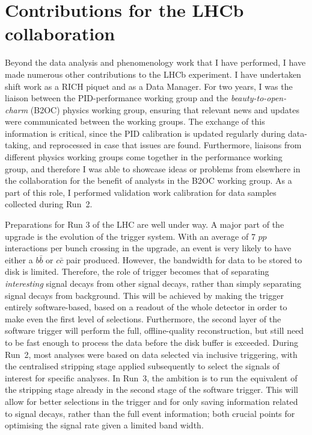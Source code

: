 \chapter{Contributions for the LHCb collaboration} %
\label{cha:contribution_for_the_lhcb_collaboration}

Beyond the data analysis and phenomenology work that I have performed, I have made numerous other contributions to the LHCb experiment. I have undertaken shift work as a RICH piquet and as a Data Manager. For two years, I was the liaison between the PID-performance working group and the \emph{beauty-to-open-charm} (B2OC) physics working group, ensuring that relevant news and updates were communicated between the working groups. The exchange of this information is critical, since the PID calibration is updated regularly during data-taking,  and reprocessed in case that issues are found. Furthermore, liaisons from different physics working groups come together in the performance working group, and therefore I was able to showcase ideas or problems from elsewhere in the collaboration for the benefit of analysts in the B2OC working group. As a part of this role, I performed validation work calibration for data samples collected during Run~2.  

Preparations for Run 3 of the LHC are well under way. A major part of the \lhcb upgrade is the evolution of the trigger system.  With an average of 7 $pp$ interactions per bunch crossing in the upgrade, an event is very likely to have either a $b\bar b$ or $c\bar c$ pair produced. However, the bandwidth for data to be stored to disk is limited. Therefore, the role of trigger becomes that of separating \emph{interesting} signal decays from other signal decays, rather than simply separating signal decays from background. This will be achieved by making the trigger entirely software-based, based on a readout of the whole detector in order to make even the first level of selections.  Furthermore, the second layer of the software trigger will perform the full, offline-quality reconstruction, but still need to be fast enough to process the data before the disk buffer is exceeded. During Run~2, most analyses were based on data selected via inclusive triggering, with the centralised stripping stage applied subsequently to select the signals of interest for specific analyses. In Run~3, the ambition is to run the equivalent of the stripping stage already in the second stage of the software trigger. This will allow for better selections in the trigger and for only saving information related to signal decays, rather than the full event information; both crucial points for optimising the signal rate given a limited band width. 

